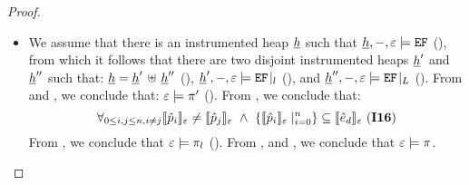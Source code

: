 \begin{proof}
\begin{itemize}
	\item {} We assume that there is an instrumented heap $\underline{h}$ such that 
	         $\underline{h}, -, \varepsilon \models \mathtt{EF}$ (), from which it follows that there are two 
	         disjoint instrumented heaps $\underline{h}'$ and $\underline{h}''$ such that: 
		$\underline{h} = \underline{h}' \, \uplus \, \underline{h}''$ (), $\underline{h}', -, \varepsilon \models \mathtt{EF}\!\mid_{l}$ (), 
		and $\underline{h}'', -, \varepsilon \models \mathtt{EF}\!\mid_{L}$ (). 
		From  and , we conclude that:  $ \varepsilon \models \pi'$ (). 
		From , we conclude that: 
		$$
		   \forall_{0 \leq i, j \leq n, i \neq j} \llbracket \hat{p}_i \rrbracket_{\varepsilon} \neq \llbracket \hat{p}_j \rrbracket_{\varepsilon} \ \wedge \
		         \{ \llbracket \hat{p}_i \rrbracket_{\varepsilon} \mid_{i=0}^n \} \subseteq \llbracket \hat{e}_d \rrbracket_{\varepsilon} \text{ ({\bf I16})}
  		$$
		From , we conclude that $\varepsilon \models \pi_{l}$ (). From ,  and , 
		we conclude that $\varepsilon \models \pi$. 
\end{itemize}


\end{proof}

